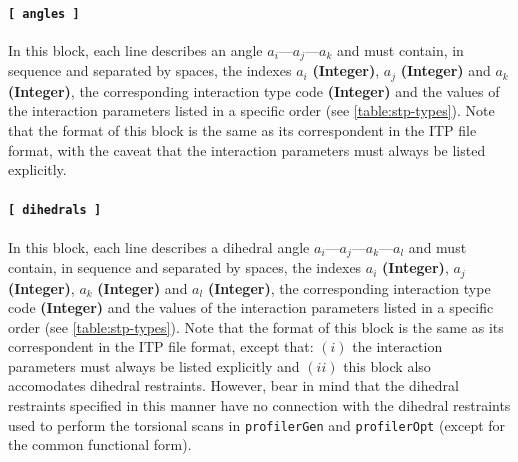 \documentclass[10pt,a4paper,openany]{memoir}
\numberwithin{equation}{section}
\newcommand{\profileropt}[0]{\texttt{profilerOpt}}
\newcommand{\profilergen}[0]{\texttt{profilerGen}}
\begin{document}
\paragraph{\texttt{[~angles~]}}

In this block, each line describes an angle $a_i$---$a_j$---$a_k$ and
must contain, in sequence and separated by spaces, the indexes $a_i$
\textbf{(Integer)}, $a_j$ \textbf{(Integer)} and $a_k$
\textbf{(Integer)}, the corresponding interaction type code
\textbf{(Integer)} and the values of the interaction parameters listed
in a specific order (see \autoref{table:stp-types}). Note that the
format of this block is the same as its correspondent in the ITP file
format, with the caveat that the interaction parameters must always be
listed explicitly.

\paragraph{\texttt{[~dihedrals~]}}

In this block, each line describes a dihedral angle
$a_i$---$a_j$---$a_k$---$a_l$ and must contain, in sequence and
separated by spaces, the indexes $a_i$ \textbf{(Integer)}, $a_j$
\textbf{(Integer)}, $a_k$ \textbf{(Integer)} and $a_l$
\textbf{(Integer)}, the corresponding interaction type code
\textbf{(Integer)} and the values of the interaction parameters listed
in a specific order (see \autoref{table:stp-types}). Note that the
format of this block is the same as its correspondent in the ITP file
format, except that: $(i)$ the interaction parameters must always be
listed explicitly and $(ii)$ this block also accomodates dihedral
restraints.
However, bear in mind that the dihedral restraints specified in this
manner have no connection with the dihedral restraints used to perform
the torsional scans in \profilergen{} and \profileropt{} (except for
the common functional form).
\end{document}
